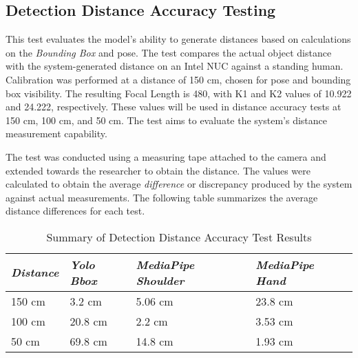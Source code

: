 \subsection{Detection Distance Accuracy Testing}

This test evaluates the model's ability to generate distances based on calculations on the \emph{Bounding Box} and pose. The test compares the actual object distance with the system-generated distance on an Intel NUC against a standing human. Calibration was performed at a distance of 150 cm, chosen for pose and bounding box visibility. The resulting Focal Length is 480, with K1 and K2 values of 10.922 and 24.222, respectively. These values will be used in distance accuracy tests at 150 cm, 100 cm, and 50 cm. The test aims to evaluate the system's distance measurement capability.

The test was conducted using a measuring tape attached to the camera and extended towards the researcher to obtain the distance. The values were calculated to obtain the average \emph{difference} or discrepancy produced by the system against actual measurements. The following table summarizes the average distance differences for each test.

\begin{table}[H]
    \centering
    \caption{Summary of Detection Distance Accuracy Test Results}
    \label{tb:ringkasan_pengukuran_kesesuaian}
    \begin{tabular}{|l|l|l|l|}
    \hline
    \textit{Distance} & \textit{Yolo Bbox} & \textit{MediaPipe Shoulder} & \textit{MediaPipe Hand} \\ \hline
    150 cm & 3.2 cm & 5.06 cm & 23.8 cm \\ \hline
    100 cm & 20.8 cm & 2.2 cm & 3.53 cm \\ \hline
    50 cm & 69.8 cm & 14.8 cm & 1.93 cm \\ \hline
    \end{tabular}
\end{table}

